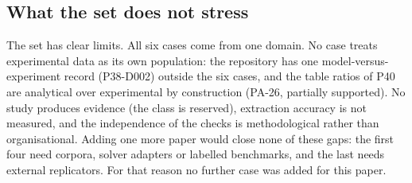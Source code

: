 \subsection{What the set does not stress}
The set has clear limits. All six cases come from one domain. No case treats experimental data as its own population: the repository has one model-versus-experiment record (P38-D002) outside the six cases, and the table ratios of P40 are analytical over experimental by construction (PA-26, partially supported). No study produces  evidence (the  class is reserved), extraction accuracy is not measured, and the independence of the checks is methodological rather than organisational. Adding one more paper would close none of these gaps: the first four need corpora, solver adapters or labelled benchmarks, and the last needs external replicators. For that reason no further case was added for this paper.
